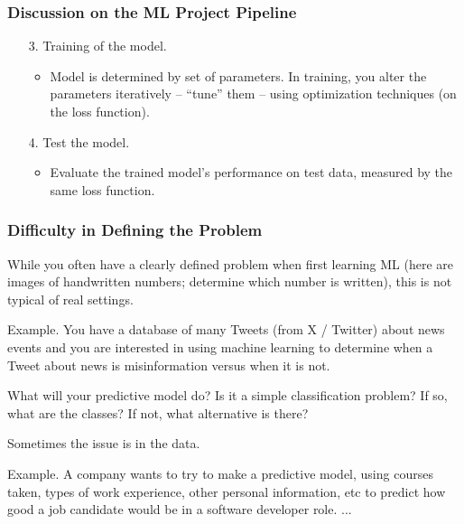 \documentclass{beamer}
\newenvironment{codeblock}
    {\hfill\begin{beamerboxesrounded}[lower=codecol, width=0.8\textwidth]
    \medskip

    }
    { 
    \end{beamerboxesrounded}\hfill
    }
\theoremstyle{example}
\newcommand{\gnum}[1]{{\color{mygreen}#1.}}
\begin{document}
\begin{frame}
\frametitle{Discussion on the ML Project Pipeline}
    \begin{enumerate}
        \item[\gnum{3}] Training of the model.
        \begin{itemize}
            \item Model is determined by set of parameters. In training, you alter the parameters iteratively {--} ``tune'' them {--} using optimization techniques (on the loss function).
        \end{itemize}
        \item[\gnum{4}] Test the model.
        \begin{itemize}
            \item Evaluate the trained model's performance on test data, measured by the same loss function.
        \end{itemize}
    \end{enumerate}
\end{frame}

\begin{frame}
\frametitle{Difficulty in Defining the Problem}
    While you often have a clearly defined problem when first learning ML (here are images of handwritten numbers; determine which number is written), this is not typical of real settings.  
    
    \begin{codeblock}
        \textcolor{mygreen}{Example.} You have a database of many Tweets (from X / Twitter) about news events and you are interested in using machine learning to determine when a Tweet about news is misinformation versus when it is not.

        What will your predictive model do? Is it a simple classification problem? If so, what are the classes? If not, what alternative is there?
    \end{codeblock}

    Sometimes the issue is in the data. 
    
    \begin{codeblock}
        \textcolor{mygreen}{Example.} A company wants to try to make a predictive model, using courses taken, types of work experience, other personal information, etc to predict how good a job candidate would be in a software developer role. ... %
    \end{codeblock}

\end{frame}
\end{document}
